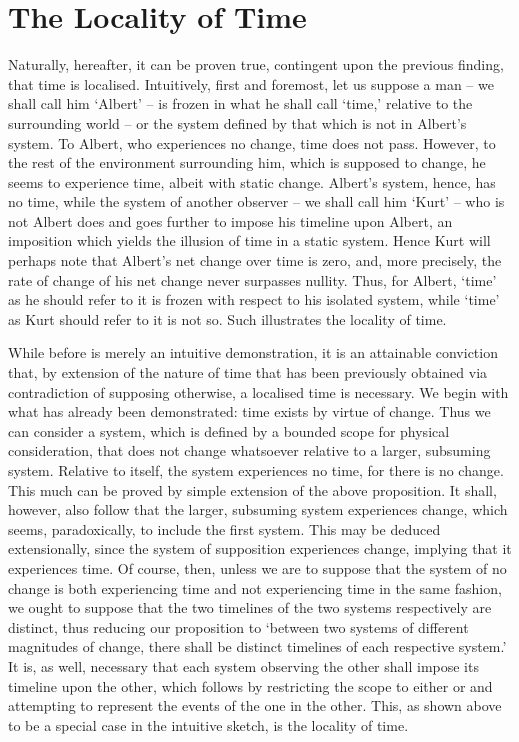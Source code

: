 \documentclass{article}
\begin{document}
\section{The Locality of Time}
Naturally, hereafter, it can be proven true, contingent upon the previous finding, that time is localised. Intuitively, first and foremost, let us suppose a man – we shall call him ‘Albert’ – is frozen in what he shall call ‘time,’ relative to the surrounding world – or the system defined by that which is not in Albert’s system. To Albert, who experiences no change, time does not pass. However, to the rest of the environment surrounding him, which is supposed to change, he seems to experience time, albeit with static change. Albert’s system, hence, has no time, while the system of another observer – we shall call him ‘Kurt’ – who is not Albert does and goes further to impose his timeline upon Albert, an imposition which yields the illusion of time in a static system. Hence Kurt will perhaps note that Albert’s net change over time is zero, and, more precisely, the rate of change of his net change never surpasses nullity. Thus, for Albert, ‘time’ as he should refer to it is frozen with respect to his isolated system, while ‘time’ as Kurt should refer to it is not so. Such illustrates the locality of time. 

While before is merely an intuitive demonstration, it is an attainable conviction that, by extension of the nature of time that has been previously obtained via contradiction of supposing otherwise, a localised time is necessary. We begin with what has already been demonstrated: time exists by virtue of change. Thus we can consider a system, which is defined by a bounded scope for physical consideration, that does not change whatsoever relative to a larger, subsuming system. Relative to itself, the system experiences no time, for there is no change. This much can be proved by simple extension of the above proposition. It shall, however, also follow that the larger, subsuming system experiences change, which seems, paradoxically, to include the first system. This may be deduced extensionally, since the system of supposition experiences change, implying that it experiences time. Of course, then, unless we are to suppose that the system of no change is both experiencing time and not experiencing time in the same fashion, we ought to suppose that the two timelines of the two systems respectively are distinct, thus reducing our proposition to ‘between two systems of different magnitudes of change, there shall be distinct timelines of each respective system.’ It is, as well, necessary that each system observing the other shall impose its timeline upon the other, which follows by restricting the scope to either or and attempting to represent the events of the one in the other. This, as shown above to be a special case in the intuitive sketch, is the locality of time. 
\end{document}

